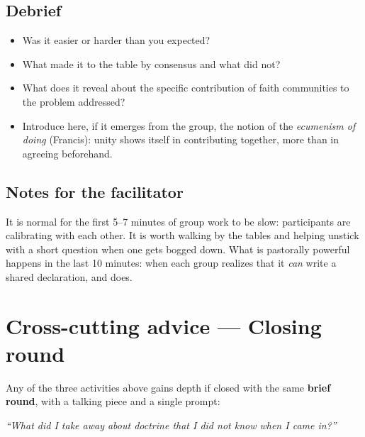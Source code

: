 \documentclass[11pt, a4paper]{article}
\begin{document}
\begin{actividad}
\subsection*{Debrief}
\begin{itemize}
  \item Was it easier or harder than you expected?
  \item What made it to the table by consensus and what did not?
  \item What does it reveal about the specific contribution of faith communities to the problem addressed?
  \item Introduce here, if it emerges from the group, the notion of the \emph{ecumenism of doing} (Francis): unity shows itself in contributing together, more than in agreeing beforehand.
\end{itemize}

\subsection*{Notes for the facilitator}
It is normal for the first 5--7 minutes of group work to be slow: participants are calibrating with each other. It is worth walking by the tables and helping unstick with a short question when one gets bogged down. What is pastorally powerful happens in the last 10 minutes: when each group realizes that it \emph{can} write a shared declaration, and does.

\end{actividad}

\newpage

\section*{Cross-cutting advice --- Closing round}

Any of the three activities above gains depth if closed with the same \textbf{brief round}, with a talking piece and a single prompt:

\vspace{0.5em}

\begin{center}
\begin{tcolorbox}[
  enhanced, colback=doctrinaAzul, colframe=doctrinaAzul,
  boxrule=0pt, arc=3pt,
  left=18pt, right=18pt, top=16pt, bottom=16pt,
  width=0.86\linewidth,
  halign=center
]
  {\color{parch}\itshape\large ``What did I take away about doctrine that I did not know when I came in?''}
\end{tcolorbox}
\end{center}
\end{document}
